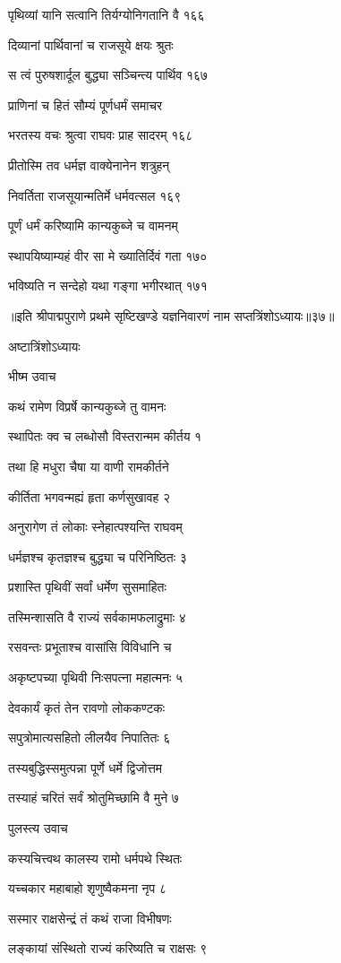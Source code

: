पृथिव्यां यानि सत्वानि तिर्यग्योनिगतानि वै १६६

दिव्यानां पार्थिवानां च राजसूये क्षयः श्रुतः

स त्वं पुरुषशार्दूल बुद्ध्या सञ्चिन्त्य पार्थिव १६७

प्राणिनां च हितं सौम्यं पूर्णधर्मं समाचर

भरतस्य वचः श्रुत्वा राघवः प्राह सादरम् १६८

प्रीतोस्मि तव धर्मज्ञ वाक्येनानेन शत्रुहन्

निवर्तिता राजसूयान्मतिर्मे धर्मवत्सल १६९

पूर्णं धर्मं करिष्यामि कान्यकुब्जे च वामनम्

स्थापयिष्याम्यहं वीर सा मे ख्यातिर्दिवं गता १७०

भविष्यति न सन्देहो यथा गङ्गा भगीरथात् १७१

॥इति श्रीपाद्मपुराणे प्रथमे सृष्टिखण्डे यज्ञनिवारणं नाम सप्तत्रिंशोऽध्यायः॥३७॥

अष्टात्रिंशोऽध्यायः

भीष्म उवाच

कथं रामेण विप्रर्षे कान्यकुब्जे तु वामनः

स्थापितः क्व च लब्धोसौ विस्तरान्मम कीर्तय १

तथा हि मधुरा चैषा या वाणी रामकीर्तने

कीर्तिता भगवन्मह्यं हृता कर्णसुखावह २

अनुरागेण तं लोकाः स्नेहात्पश्यन्ति राघवम्

धर्मज्ञश्च कृतज्ञश्च बुद्ध्या च परिनिष्ठितः ३

प्रशास्ति पृथिवीं सर्वां धर्मेण सुसमाहितः

तस्मिन्शासति वै राज्यं सर्वकामफलाद्रुमाः ४

रसवन्तः प्रभूताश्च वासांसि विविधानि च

अकृष्टपच्या पृथिवी निःसपत्ना महात्मनः ५

देवकार्यं कृतं तेन रावणो लोककण्टकः

सपुत्रोमात्यसहितो लीलयैव निपातितः ६

तस्यबुद्धिस्समुत्पन्ना पूर्णे धर्मे द्विजोत्तम

तस्याहं चरितं सर्वं श्रोतुमिच्छामि वै मुने ७

पुलस्त्य उवाच

कस्यचित्त्वथ कालस्य रामो धर्मपथे स्थितः

यच्चकार महाबाहो शृणुष्वैकमना नृप ८

सस्मार राक्षसेन्द्रं तं कथं राजा विभीषणः

लङ्कायां संस्थितो राज्यं करिष्यति च राक्षसः ९

